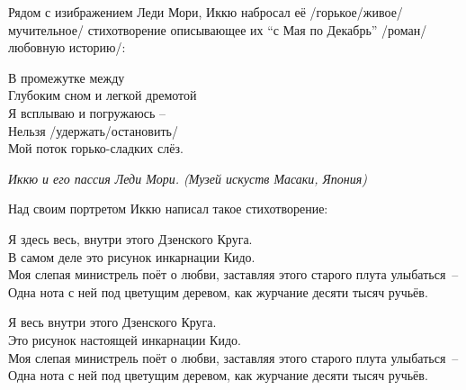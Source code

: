 \begin{ver}
    Рядом с изибражением Леди Мори, Иккю набросал её
    /горькое/живое/мучительное/ стихотворение
    описывающее их ``с Мая по Декабрь'' /роман/любовную историю/:
\end{ver}

\begin{ver}
  \begin{verses}
    В промежутке между\\
    Глубоким сном и легкой дремотой\\
    Я всплываю и погружаюсь --\\
    Нельзя /удержать/остановить/\\
    Мой поток горько-сладких слёз.
  \end{verses}
\end{ver}

\begin{ver}[1]\it
Иккю и его пассия Леди Мори. (Музей искуств Масаки, Япония)
\end{ver}

\begin{ver}[1]
  Над своим портретом Иккю написал такое стихотворение:
\end{ver}

\begin{ver}[1]
  \begin{verses}
    Я здесь весь, внутри этого Дзенского Круга.\\ 
    В самом деле это рисунок инкарнации Кидо.\\
    Моя слепая министрель поёт о любви, заставляя этого старого
    плута улыбаться~--\\
    Одна нота с ней под цветущим деревом, как журчание десяти тысяч
    ручьёв.  
  \end{verses}
\end{ver}

\begin{ver}[2]
  \begin{verses}
    Я весь внутри этого Дзенского Круга.\\ 
    Это рисунок настоящей инкарнации Кидо.\\
    Моя слепая министрель поёт о любви, заставляя этого старого
    плута улыбаться~--\\
    Одна нота с ней под цветущим деревом, как журчание десяти тысяч
    ручьёв.  
  \end{verses}
\end{ver}

